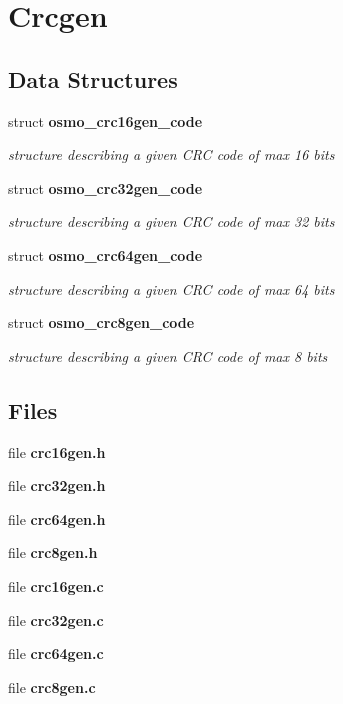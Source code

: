 \section{Crcgen}
\label{group__crcgen}
\subsection*{Data Structures}
\begin{DoxyCompactItemize}
\item 
struct {\bf osmo\_\-crc16gen\_\-code}
\begin{DoxyCompactList}\small\item\em structure describing a given CRC code of max 16 bits \item\end{DoxyCompactList}\item 
struct {\bf osmo\_\-crc32gen\_\-code}
\begin{DoxyCompactList}\small\item\em structure describing a given CRC code of max 32 bits \item\end{DoxyCompactList}\item 
struct {\bf osmo\_\-crc64gen\_\-code}
\begin{DoxyCompactList}\small\item\em structure describing a given CRC code of max 64 bits \item\end{DoxyCompactList}\item 
struct {\bf osmo\_\-crc8gen\_\-code}
\begin{DoxyCompactList}\small\item\em structure describing a given CRC code of max 8 bits \item\end{DoxyCompactList}\end{DoxyCompactItemize}
\subsection*{Files}
\begin{DoxyCompactItemize}
\item 
file {\bf crc16gen.h}
\item 
file {\bf crc32gen.h}
\item 
file {\bf crc64gen.h}
\item 
file {\bf crc8gen.h}
\item 
file {\bf crc16gen.c}
\item 
file {\bf crc32gen.c}
\item 
file {\bf crc64gen.c}
\item 
file {\bf crc8gen.c}
\end{DoxyCompactItemize}
